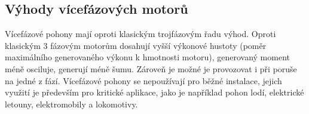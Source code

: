 \subsection{Výhody vícefázových motorů}

Vícefázové pohony mají oproti klasickým trojfázovým řadu výhod. Oproti klasickým 3 fázovým motorům dosahují vyšší výkonové hustoty (poměr maximálního generovaného výkonu k hmotnosti motoru), generovaný moment méně osciluje, generují méně šumu. Zároveň je možné je provozovat i při poruše na jedné z fází\cite{WileyHigPer}. Vícefázové pohony se nepoužívají pro běžné instalace, jejich využití je především pro kritické aplikace, jako je například pohon lodí, elektrické letouny, elektromobily a lokomotivy.

